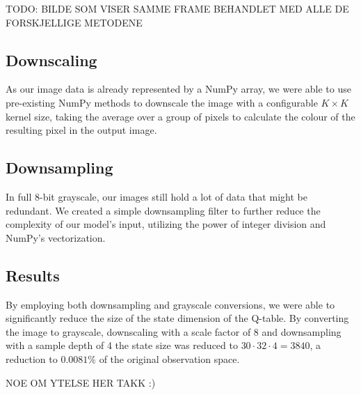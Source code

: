 TODO: BILDE SOM VISER SAMME FRAME BEHANDLET MED ALLE DE FORSKJELLIGE METODENE

\subsection{Downscaling}

As our image data is already represented by a NumPy array, we were able to use pre-existing NumPy methods to downscale the image with a configurable $K \times K$ kernel size, taking the average over a group of pixels to calculate the colour of the resulting pixel in the output image.

\subsection{Downsampling}

In full 8-bit grayscale, our images still hold a lot of data that might be redundant. We created a simple downsampling filter to further reduce the complexity of our model's input, utilizing the power of integer division and NumPy's vectorization.

\subsection{Results}

By employing both downsampling and grayscale conversions, we were able to significantly reduce the size of the state dimension of the Q-table. By converting the image to grayscale, downscaling with a scale factor of 8 and downsampling with a sample depth of 4 the state size was reduced to $30 \cdot 32 \cdot 4 = 3840$, a reduction to $0.0081\%$ of the original observation space.

NOE OM YTELSE HER TAKK :)
